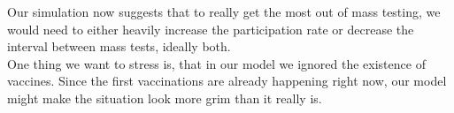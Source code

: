 \documentclass
[
    a4paper,
    11pt,
    bibliography = totoc,
    listof = totoc,
    headinclude = true,
]
{scrreport}
\begin{document}
Our simulation now suggests that to really get the most out of mass testing, we would need to either heavily increase the participation rate or decrease the interval between mass tests, ideally both. \\

One thing we want to stress is, that in our model we ignored the existence of vaccines. Since the first vaccinations are already happening right now, our model might make the situation look more grim than it really is.

\printbibliography{}
\end{document}
